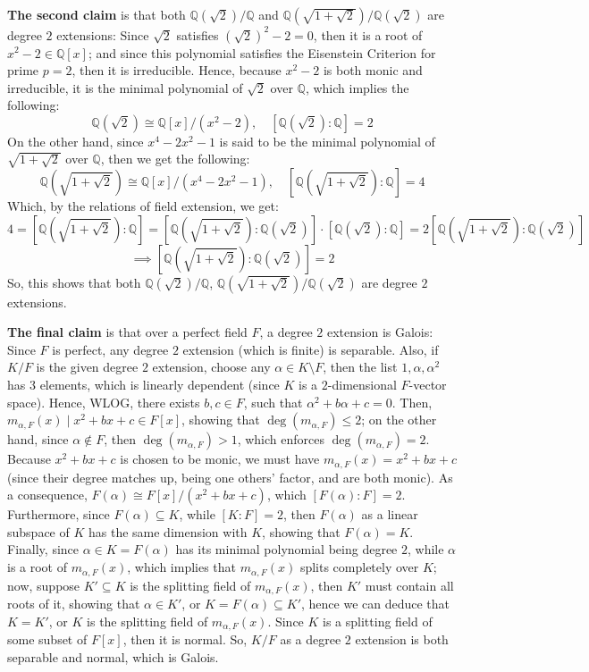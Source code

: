 \documentclass{article}
\begin{document}
\begin{itemize}
    \textbf{The second claim} is that both $\mathbb{Q}(\sqrt{2})/\mathbb{Q}$ and $\mathbb{Q}(\sqrt{1+\sqrt{2}})/\mathbb{Q}(\sqrt{2})$ are degree $2$ extensions: Since $\sqrt{2}$ satisfies $(\sqrt{2})^2-2=0$, then it is a root of $x^2-2\in\mathbb{Q}[x]$; and since this polynomial satisfies the Eisenstein Criterion for prime $p=2$, then it is irreducible. Hence, because $x^2-2$ is both monic and irreducible, it is the minimal polynomial of $\sqrt{2}$ over $\mathbb{Q}$, which implies the following:
    $$\mathbb{Q}(\sqrt{2})\cong \mathbb{Q}[x]/(x^2-2),\quad [\mathbb{Q}(\sqrt{2}):\mathbb{Q}] = 2$$
    On the other hand, since $x^4-2x^2-1$ is said to be the minimal polynomial of $\sqrt{1+\sqrt{2}}$ over $\mathbb{Q}$, then we get the following:
    $$\mathbb{Q}\left(\sqrt{1+\sqrt{2}}\right)\cong \mathbb{Q}[x]/(x^4-2x^2-1),\quad \left[\mathbb{Q}\left(\sqrt{1+\sqrt{2}}\right):\mathbb{Q}\right]=4$$
    Which, by the relations of field extension, we get:
    $$4=\left[\mathbb{Q}\left(\sqrt{1+\sqrt{2}}\right):\mathbb{Q}\right] = \left[\mathbb{Q}\left(\sqrt{1+\sqrt{2}}\right):\mathbb{Q}(\sqrt{2})\right]\cdot [\mathbb{Q}(\sqrt{2}):\mathbb{Q}] = 2\left[\mathbb{Q}\left(\sqrt{1+\sqrt{2}}\right):\mathbb{Q}(\sqrt{2})\right]$$
    $$\implies \left[\mathbb{Q}\left(\sqrt{1+\sqrt{2}}\right):\mathbb{Q}(\sqrt{2})\right] = 2$$
    So, this shows that both $\mathbb{Q}(\sqrt{2})/\mathbb{Q}$, $\mathbb{Q}(\sqrt{1+\sqrt{2}})/\mathbb{Q}(\sqrt{2})$ are degree $2$ extensions.

    \textbf{The final claim} is that over a perfect field $F$, a degree $2$ extension is Galois: Since $F$ is perfect, any degree $2$ extension (which is finite) is separable. Also, if $K/F$ is the given degree $2$ extension, choose any $\alpha\in K\setminus F$, then the list $1,\alpha,\alpha^2$ has $3$ elements, which is linearly dependent (since $K$ is a $2$-dimensional $F$-vector space). Hence, WLOG, there exists $b,c\in F$, such that $\alpha^2+b\alpha+c=0$. Then, $m_{\alpha,F}(x)\mid x^2+bx+c\in F[x]$, showing that $\deg(m_{\alpha,F})\leq 2$; on the other hand, since $\alpha\notin F$, then $\deg(m_{\alpha,F})>1$, which enforces $\deg(m_{\alpha,F})=2$. Because $x^2+bx+c$ is chosen to be monic, we must have $m_{\alpha,F}(x)=x^2+bx+c$ (since their degree matches up, being one others' factor, and are both monic). As a consequence, $F(\alpha)\cong F[x]/(x^2+bx+c)$, which $[F(\alpha):F]=2$. Furthermore, since $F(\alpha)\subseteq K$, while $[K:F]=2$, then $F(\alpha)$ as a linear subspace of $K$ has the same dimension with $K$, showing that $F(\alpha)=K$. Finally, since $\alpha\in K=F(\alpha)$ has its minimal polynomial being degree $2$, while $\alpha$ is a root of $m_{\alpha,F}(x)$, which implies that $m_{\alpha,F}(x)$ splits completely over $K$; now, suppose $K'\subseteq K$ is the splitting field of $m_{\alpha,F}(x)$, then $K'$ must contain all roots of it, showing that $\alpha\in K'$, or $K=F(\alpha)\subseteq K'$, hence we can deduce that $K=K'$, or $K$ is the splitting field of $m_{\alpha,F}(x)$. Since $K$ is a splitting field of some subset of $F[x]$, then it is normal.
    So, $K/F$ as a degree $2$ extension is both separable and normal, which is Galois.


\end{itemize}
\end{document}
